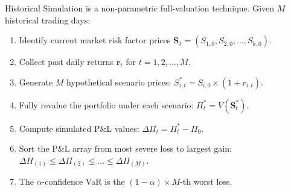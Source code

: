 Historical Simulation is a non-parametric full-valuation technique. Given $M$ historical trading days:
\begin{enumerate}[leftmargin=1.5em, itemsep=3pt]
    \item Identify current market risk factor prices $\mathbf{S}_0 = (S_{1,0}, S_{2,0}, \dots, S_{k,0})$.
    \item Collect past daily returns $\mathbf{r}_t$ for $t = 1, 2, \dots, M$.
    \item Generate $M$ hypothetical scenario prices: $S_{i,t}^* = S_{i,0} \times (1 + r_{i,t})$.
    \item Fully revalue the portfolio under each scenario: $\Pi_t^* = V(\mathbf{S}_t^*)$.
    \item Compute simulated P\&L values: $\Delta \Pi_t = \Pi_t^* - \Pi_0$.
    \item Sort the P\&L array from most severe loss to largest gain: $\Delta \Pi_{(1)} \le \Delta \Pi_{(2)} \le \dots \le \Delta \Pi_{(M)}$.
    \item The $\alpha$-confidence VaR is the $(1 - \alpha) \times M$-th worst loss.
\end{enumerate}

